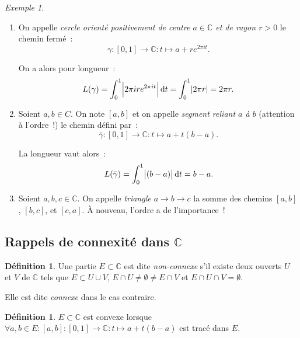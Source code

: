 \documentclass{report}
\theoremstyle{definition}
\newtheorem{déf}[thm]{Définition}
\theoremstyle{remark}
\newtheorem{ex}{Exemple}[chapter]
\numberwithin{equation}{section}
\newcommand{\C}{\mathbb C}
\begin{document}
			\begin{ex}~
			\begin{enumerate}
				\item On appelle \textit{cercle orienté positivement de centre $a \in \C$ et de rayon $r > 0$} le chemin fermé~:
				\begin{equation}
					\gamma : [0, 1] \to \C : t \mapsto a + re^{2\pi it}.
				\end{equation}

				On a alors pour longueur~:
				\begin{equation}
					L(\gamma) = \int_0^1 \abs {2\pi i re^{2\pi it}}\dif t = \int_0^1\abs {2\pi r} = 2\pi r.
				\end{equation}

				\item Soient $a, b \in C$. On note $[a, b]$ et on appelle \textit{segment reliant $a$ à $b$} (attention à l'ordre~!) le chemin défini par~:
				\begin{equation}
					\bar \gamma : [0, 1] \to \C : t \mapsto a + t(b-a).
				\end{equation}

				La longueur vaut alors~:
				\begin{equation}
					L(\bar \gamma) = \int_0^1\abs {(b-a)}\dif t = b-a.
				\end{equation}

				\item Soient $a, b, c \in \C$. On appelle \textit{triangle $a \to b \to c$} la somme des chemins $[a, b]$, $[b, c]$, et $[c, a]$.
				À nouveau, l'ordre a de l'importance~!
			\end{enumerate}
			\end{ex}

		\subsection{Rappels de connexité dans $\C$}
			\begin{déf} Une partie $E \subset \C$ est dite \textit{non-connexe} s'il existe deux ouverts $U$ et $V$ de $\C$ tels que $E \subset U \cup V$,
			$E \cap U \neq \emptyset \neq E \cap V$ et $E \cap U \cap V = \emptyset$.

			Elle est dite \textit{connexe} dans le cas contraire.
			\end{déf}

			\begin{déf} $E \subset \C$ est convexe lorsque $\forall a, b \in E : [a, b] : [0, 1] \to \C : t \mapsto a + t(b-a)$ est tracé dans $E$.
			\end{déf}
\end{document}
